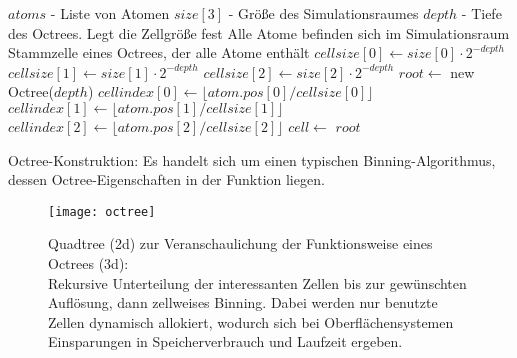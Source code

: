 \begin{algorithm}
  \begin{algorithmic}
    \Input $atoms$ - Liste von Atomen
    \Input $size[3]$ - Größe des Simulationsraumes
    \Input $depth$ - Tiefe des Octrees. Legt die Zellgröße fest
    \Assumption Alle Atome befinden sich im Simulationsraum
    \Result Stammzelle eines Octrees, der alle Atome enthält
    \State
    \State $cellsize[0] \gets size[0]\cdot2^{-depth}$
    \State $cellsize[1] \gets size[1]\cdot2^{-depth}$
    \State $cellsize[2] \gets size[2]\cdot2^{-depth}$
    \State $root \gets$ new Octree($depth$)
    \State $cellindex[0] \gets \lfloor atom.pos[0] / cellsize[0] \rfloor$
    \State $cellindex[1] \gets \lfloor atom.pos[1] / cellsize[1] \rfloor$
    \State $cellindex[2] \gets \lfloor atom.pos[2] / cellsize[2] \rfloor$
    \State $cell \gets$ 
    \State {}
    \EndFor
    \State \Return $root$
    \EndFunction
  \end{algorithmic}
  \label{alco:octree-construction}
  \caption[Octree-Konstruktion]{Octree-Konstruktion: Es handelt sich um einen typischen Binning-Algorithmus, dessen Octree-Eigenschaften in der Funktion  liegen.}
\end{algorithm}

\begin{figure}[tbhp]
  \centering
  \texttt{[image: octree]}
  \label{fig:octree}
  \caption[Quadtree-Veranschaulichung eines Octrees]{Quadtree (2d) zur Veranschaulichung der Funktionsweise eines Octrees (3d):\\
    Rekursive Unterteilung der interessanten Zellen bis zur gewünschten Auflösung, dann zellweises Binning.
    Dabei werden nur benutzte Zellen dynamisch allokiert, wodurch sich bei Oberflächensystemen Einsparungen in Speicherverbrauch und Laufzeit ergeben.
  }
\end{figure}

